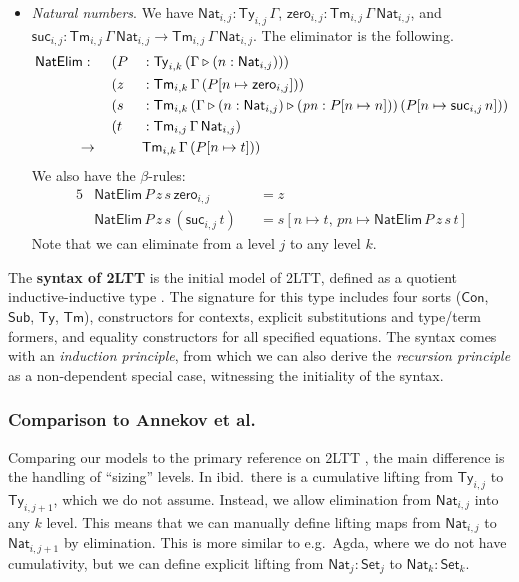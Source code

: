 \documentclass[acmsmall,screen]{acmart}
\newcommand{\mit}[1]{\mathit{#1}}
\newcommand{\msf}[1]{\mathsf{#1}}
\newcommand{\ext}{\triangleright}
\newcommand{\NatElim}{\msf{NatElim}}
\newcommand{\Con}{\msf{Con}}
\newcommand{\Sub}{\msf{Sub}}
\newcommand{\Ty}{\msf{Ty}}
\newcommand{\Tm}{\msf{Tm}}
\newcommand{\Nat}{\msf{Nat}}
\newcommand{\zero}{\msf{zero}}
\newcommand{\suc}{\msf{suc}}
\newcommand{\Set}{\mathsf{Set}}
\theoremstyle{remark}
\begin{document}
\begin{definition}
\begin{itemize}
\item \emph{Natural numbers}. We have $\Nat_{i,j} : \Ty_{i,j}\,\Gamma$, $\zero_{i,j} : \Tm_{i,j}\,\Gamma\,\Nat_{i,j}$,
  and $\suc_{i,j} : \Tm_{i,j}\,\Gamma\,\Nat_{i,j} \to \Tm_{i,j}\,\Gamma\,\Nat_{i,j}$. The eliminator is the following.
  \begin{alignat*}{5}
    & \NatElim :\hspace{0.5em}
                &&  (P &&: \Ty_{i,k}\,(\Gamma \ext (n : \Nat_{i,j}))) \\
    &           &&  (z &&: \Tm_{i,k}\,\Gamma\,(P[n\mapsto \zero_{i,j}])) \\
    &           &&  (s &&: \Tm_{i,k}\,(\Gamma \ext (n : \Nat_{i,j}) \ext (\mit{pn} : P[n\mapsto n]))\,(P[n\mapsto \suc_{i,j}\,n]))\\
    &           &&  (t &&: \Tm_{i,j}\,\Gamma\,\Nat_{i,j}) \\
    &\hspace{3em}\to        &&&& \Tm_{i,k}\,\Gamma\,(P[n\mapsto t]))
  \end{alignat*}
  We also have the $\beta$-rules:
  \begin{alignat*}{5}
    & \NatElim\,P\,z\,s\,\zero_{i,j}     &&= z \\
    & \NatElim\,P\,z\,s\,(\suc_{i,j}\,t) &&= s[n \mapsto t,\,\mit{pn} \mapsto \NatElim\,P\,z\,s\,t]
  \end{alignat*}
  Note that we can eliminate from a level $j$ to any level $k$.
\end{itemize}
\end{definition}

\begin{definition}
The \textbf{syntax of 2LTT} is the initial model of 2LTT, defined as a quotient
inductive-inductive type \cite{kaposi2019constructing}. The signature for this
type includes four sorts ($\Con$, $\Sub$, $\Ty$, $\Tm$), constructors for
contexts, explicit substitutions and type/term formers, and equality
constructors for all specified equations. The syntax comes with an
\emph{induction principle}, from which we can also derive the \emph{recursion principle} as a
non-dependent special case, witnessing the initiality of the syntax.
\end{definition}

\subsubsection{Comparison to Annekov et al.}
Comparing our models to the primary reference on 2LTT \cite{twolevel}, the main
difference is the handling of ``sizing'' levels. In ibid.\ there is a cumulative
lifting from $\Ty_{i,j}$ to $\Ty_{i,j+1}$, which we do not assume. Instead,
we allow elimination from $\Nat_{i,j}$ into any $k$ level. This means that we
can manually define lifting maps from $\Nat_{i,j}$ to $\Nat_{i,j+1}$ by
elimination. This is more similar to e.g.\ Agda, where we do not have cumulativity,
but we can define explicit lifting from $\Nat_j : \Set_j$ to $\Nat_k : \Set_k$.
\end{document}

